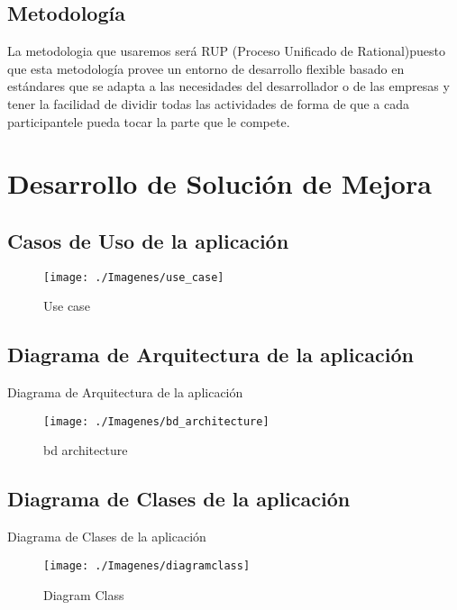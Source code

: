 \documentclass[twoside,twocolumn]{article}
\begin{document}
\subsection{Metodología}
La metodologia que usaremos será RUP (Proceso Unificado de Rational)puesto que esta metodología provee un entorno de desarrollo flexible basado en estándares que se adapta a las necesidades del desarrollador o de las empresas y tener la facilidad de dividir todas las actividades de forma de que a cada participantele pueda tocar la parte que le compete.



\section{Desarrollo de Solución de Mejora}

\subsection{Casos de Uso de la aplicación}
\begin{figure}[h!]
	\begin{center}
		\texttt{[image: ./Imagenes/use\_case]} 
		\caption{Use case}
	\end{center}
\end{figure}

\subsection{Diagrama de Arquitectura de la aplicación}
Diagrama de Arquitectura de la aplicación
\begin{figure}[h!]
	\begin{center}
		\texttt{[image: ./Imagenes/bd\_architecture]} 
		\caption{bd architecture}
	\end{center}
\end{figure}

\subsection{Diagrama de Clases de la aplicación}
Diagrama de Clases de la aplicación
\begin{figure}[h!]
	\begin{center}
		\texttt{[image: ./Imagenes/diagramclass]} 
		\caption{Diagram Class}
	\end{center}
\end{figure}
\end{document}
